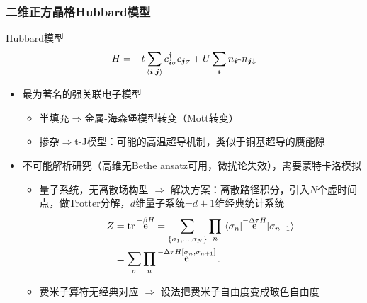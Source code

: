\documentclass[UTF8]{ctexbeamer}
\DeclareMathOperator{\ee}{e}
\newcommand{\pair}[1]{\langle #1 \rangle}
\begin{document}
\begin{frame}
\frametitle{二维正方晶格Hubbard模型}

Hubbard模型
\begin{equation}
    H = - t\sum_{\pair{\vb*{i}, \vb*{j}}} c^\dagger_{\vb*{i} \sigma} c_{\vb*{j} \sigma} + U \sum_{\vb*{i}} n_{\vb*{i} \uparrow} n_{\vb*{j} \downarrow}
\end{equation}    
\begin{itemize}
    \item 最为著名的强关联电子模型
    \begin{itemize}
        \item 半填充$\Rightarrow$金属-海森堡模型转变（Mott转变）
        \item 掺杂$\Rightarrow$t-J模型：可能的高温超导机制，类似于铜基超导的赝能隙
    \end{itemize}
    \item 不可能解析研究（高维无Bethe ansatz可用，微扰论失效），需要蒙特卡洛模拟
    \begin{itemize}
        \item 量子系统，无离散场构型 $\Rightarrow$ 解决方案：离散路径积分，引入$N$个虚时间点，做Trotter分解，$d$维量子系统=$d+1$维经典统计系统
        \begin{equation}
            \begin{aligned}
                Z &= \trace \ee^{- \beta H} = \sum_{\{ \sigma_1, \ldots, \sigma_N \}} \prod_{n} \mel{\sigma_n}{\ee^{- \Delta \tau H}}{\sigma_{n+1}} \\
                &= \sum_\sigma \prod_n \ee^{- \Delta \tau H[\sigma_n, \sigma_{n+1}]}.
            \end{aligned}
        \end{equation}
        \item 费米子算符无经典对应 $\Rightarrow$ 设法把费米子自由度变成玻色自由度
    \end{itemize}
\end{itemize}

\end{frame}
\end{document}
